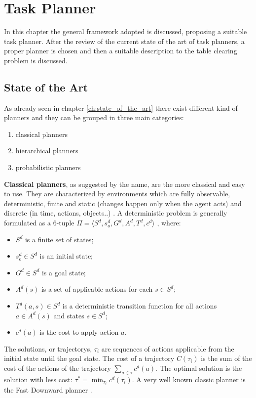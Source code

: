 \chapter{Task Planner}
\label{ch:task_planner}
In this chapter the general framework adopted is discussed, proposing a suitable task planner. After the  review of the current state of the art of task planners, a proper planner is chosen and then a suitable description to the table clearing problem is discussed.
\section{State of the Art}
As already seen in chapter \ref{ch:state_of_the_art} there exist different kind of planners and they can be grouped in three main categories:
\begin{enumerate}
\item classical planners
\item hierarchical planners
\item probabilistic planners
\end{enumerate}
\textbf{Classical planners}, as suggested by the name, are the more classical and easy to use. They are characterized by environments which are fully observable, deterministic, finite and static (changes happen only when the agent acts) and discrete (in time, actions, objects..) \citep{artificialIntelligence}.
A deterministic problem is generally formulated as a $6$-tuple $\Pi=\langle S^d, s_o^d, G^d, A^d, T^d, c^d \rangle$ \cite{little2007probabilistic}, where:
\begin{itemize}
\item $S^d$ is a finite set of states;
\item $s_o^d \in S^d$ is an initial state;
\item $G^d \in S^d$ is a goal state;
\item $A^d(s)$ is a set of applicable actions for each $s \in S^d$;
\item $T^d(a,s) \in S^d$ is a deterministic transition function for all actions $a \in A^d(s)$ and states $ s \in S^d$;
\item $c^d(a)$ is the cost to apply action $a$. 
\end{itemize}
The solutions, or trajectorys, $\tau_i$ are sequences of actions applicable from the initial state until the goal state. The cost of a trajectory $C(\tau_i)$ is the sum of the cost of the actions of the trajectory $\sum_{a \in \tau} c^d(a)$. The optimal solution is the solution with less cost: $\tau^* = \min_{\tau_i} c^d(\tau_i)$. A very well known classic planner is the Fast Downward planner \cite{helmert2006fast}.

